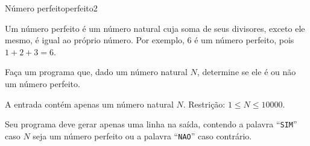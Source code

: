 \documentclass[12pt,a4paper,oneside]{article}
\begin{document}
\begin{problem}{Número perfeito}{perfeito}{2}
 
Um número perfeito é um número natural cuja soma de seus divisores, exceto ele mesmo, é igual ao próprio número. Por exemplo, 6 é um número perfeito, pois $1+2+3=6$.

Faça um programa que, dado um número natural $N$, determine se ele é ou não um número perfeito.

%

\InputFile

A entrada contém apenas um número natural $N$. Restrição: $1 \leq N \leq 10000$.


\OutputFile

Seu programa deve gerar apenas uma linha na saída, contendo a palavra ``\texttt{SIM}'' caso $N$ seja um número perfeito ou a palavra ``\texttt{NAO}'' caso contrário.


\Example

\begin{example}
%
\end{example}

\begin{example}
%
\end{example}

\begin{example}
%
\end{example}




\end{problem}
\end{document}
